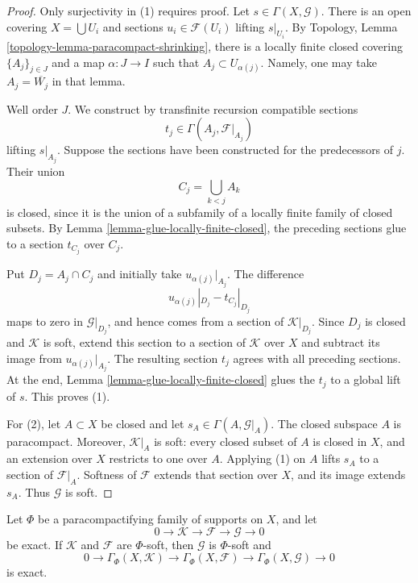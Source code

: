 \begin{proof}
Only surjectivity in (1) requires proof. Let
$s \in \Gamma(X, \mathcal{G})$. There is an open covering
$X = \bigcup U_i$ and sections $u_i \in \mathcal{F}(U_i)$ lifting
$s|_{U_i}$. By Topology, Lemma
\ref{topology-lemma-paracompact-shrinking}, there is a locally finite
closed covering $\{A_j\}_{j \in J}$ and a map $\alpha : J \to I$ such
that $A_j \subset U_{\alpha(j)}$. Namely, one may take
$A_j = \overline{W_j}$ in that lemma.

Well order $J$. We construct by transfinite recursion compatible
sections
$$
t_j \in \Gamma(A_j, \mathcal{F}|_{A_j})
$$
lifting $s|_{A_j}$. Suppose the sections have been constructed for the
predecessors of $j$. Their union
$$
C_j = \bigcup_{k < j} A_k
$$
is closed, since it is the union of a subfamily of a locally finite
family of closed subsets. By Lemma
\ref{lemma-glue-locally-finite-closed}, the preceding sections glue to a
section $t_{C_j}$ over $C_j$.

Put $D_j = A_j \cap C_j$ and initially take
$u_{\alpha(j)}|_{A_j}$. The difference
$$
u_{\alpha(j)}|_{D_j} - t_{C_j}|_{D_j}
$$
maps to zero in $\mathcal{G}|_{D_j}$, and hence comes from a section of
$\mathcal{K}|_{D_j}$. Since $D_j$ is closed and $\mathcal{K}$ is soft,
extend this section to a section of $\mathcal{K}$ over $X$ and subtract
its image from $u_{\alpha(j)}|_{A_j}$. The resulting section $t_j$
agrees with all preceding sections. At the end, Lemma
\ref{lemma-glue-locally-finite-closed} glues the $t_j$ to a global lift
of $s$. This proves (1).

For (2), let $A \subset X$ be closed and let
$s_A \in \Gamma(A, \mathcal{G}|_A)$. The closed subspace $A$ is
paracompact. Moreover, $\mathcal{K}|_A$ is soft: every closed subset of
$A$ is closed in $X$, and an extension over $X$ restricts to one over
$A$. Applying (1) on $A$ lifts $s_A$ to a section of
$\mathcal{F}|_A$. Softness of $\mathcal{F}$ extends that section over
$X$, and its image extends $s_A$. Thus $\mathcal{G}$ is soft.
\end{proof}

\begin{lemma}
\label{lemma-phi-soft-exact}
Let $\Phi$ be a paracompactifying family of supports on $X$, and let
$$
0 \longrightarrow \mathcal{K} \longrightarrow \mathcal{F}
\longrightarrow \mathcal{G} \longrightarrow 0
$$
be exact. If $\mathcal{K}$ and $\mathcal{F}$ are $\Phi$-soft, then
$\mathcal{G}$ is $\Phi$-soft and
$$
0 \longrightarrow \Gamma_\Phi(X, \mathcal{K})
\longrightarrow \Gamma_\Phi(X, \mathcal{F})
\longrightarrow \Gamma_\Phi(X, \mathcal{G})
\longrightarrow 0
$$
is exact.
\end{lemma}

